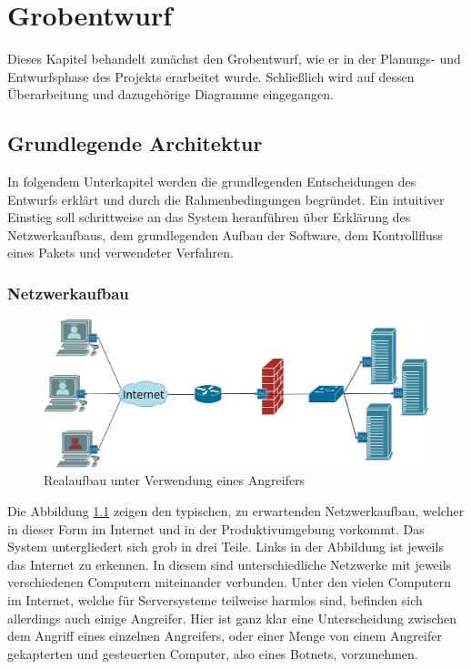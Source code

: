 \documentclass[../review_2.tex]{subfiles}
\begin{document}
\chapter{Grobentwurf}\thispagestyle{fancy}


Dieses Kapitel behandelt zunächst den Grobentwurf, wie er in der Planungs- und Entwurfsphase des Projekts erarbeitet wurde. Schließlich wird auf dessen Überarbeitung und dazugehörige Diagramme eingegangen. 

\section{Grundlegende Architektur}

In folgendem Unterkapitel werden die grundlegenden Entscheidungen des Entwurfs erklärt und durch die Rahmenbedingungen begründet. Ein intuitiver Einstieg soll schrittweise an das System heranführen über Erklärung des Netzwerkaufbaus, dem grundlegenden Aufbau der Software, dem Kontrollfluss eines Pakets und verwendeter Verfahren.

\subsection{Netzwerkaufbau}
\begin{figure}[h]
    \centering
    \includegraphics[width=1.0\linewidth]{img/Netzwerkplan-Real}
    \caption{Realaufbau unter Verwendung eines Angreifers}
    \label{fig:netzwerkplan-real}
\end{figure}
Die Abbildung \ref{fig:netzwerkplan-real} zeigen den typischen, zu erwartenden Netzwerkaufbau, welcher in dieser Form im Internet und in der Produktivumgebung vorkommt. Das System untergliedert sich grob in drei Teile. Links in der Abbildung ist jeweils das Internet zu erkennen. In diesem sind unterschiedliche Netzwerke mit jeweils verschiedenen Computern miteinander verbunden. Unter den vielen Computern im Internet, welche für Serversysteme teilweise harmlos sind, befinden sich allerdings auch einige Angreifer. Hier ist ganz klar eine Unterscheidung zwischen dem Angriff eines einzelnen Angreifers, oder einer Menge von einem Angreifer gekapterten und gesteuerten Computer, also eines Botnets, vorzunehmen. 
\end{document}
